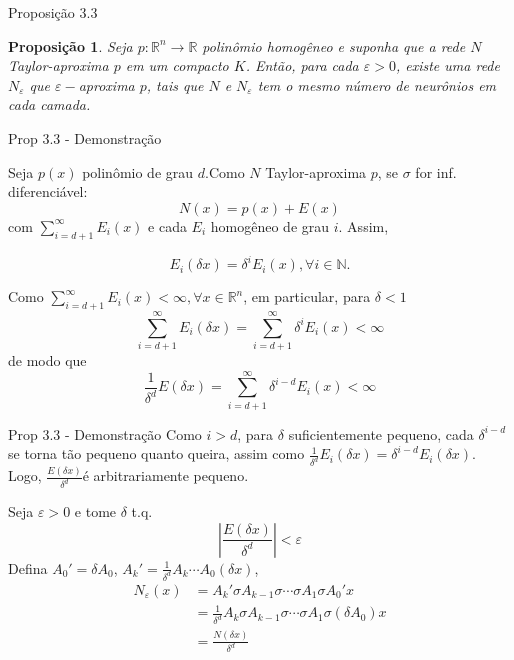 \documentclass{beamer}
\newtheorem{prop}{Proposição}[section]
\theoremstyle{definition}
\begin{document}
\begin{frame}{Proposição 3.3}
    \begin{prop}
    Seja $p:\mathbb R^n \to \mathbb R$ polinômio homogêneo e suponha que a rede $N$ Taylor-aproxima $p$ em um compacto $K$. Então, para cada $\varepsilon>0$, existe uma rede $N_{\varepsilon}$ que $\varepsilon-$aproxima $p$, tais que $N$ e $N_\varepsilon$ tem o mesmo número de neurônios em cada camada.
    \end{prop}
\end{frame}

\begin{frame}{Prop 3.3 - Demonstração}
    \small

    Seja $p(x)$ polinômio de grau $d$.\pause Como $N$ Taylor-aproxima $p$, se $\sigma$ for inf. diferenciável:
    \begin{equation}
        N(x) = p(x) + E(x)
    \end{equation}
    com $\sum_{i=d+1}^\infty E_i(x)$ e cada $E_i$ homogêneo de grau $i$. \pause Assim,
    
    \begin{equation*}
        E_i(\delta x) = \delta^i E_i(x), \forall i \in \mathbb N.
    \end{equation*}

    \pause 

    Como $\sum_{i=d+1}^\infty E_i(x)<\infty, \forall x \in \mathbb R^n$, em particular, para $\delta<1$
    \begin{equation*}
        \sum_{i=d+1}^\infty E_i(\delta x) = \sum_{i=d+1}^\infty \delta^i E_i(x) <\infty
    \end{equation*}
    \pause de modo que
    \begin{equation*}
        \frac{1}{\delta^d} E(\delta x) = \sum_{i=d+1}^\infty \delta^{i-d} E_i(x) <\infty
    \end{equation*}
\end{frame}

\begin{frame}{Prop 3.3 - Demonstração}
    Como $i>d$, para $\delta$ suficientemente pequeno, cada $\delta^{i-d}$ se torna tão pequeno quanto queira, assim como $\frac{1}{\delta^d}E_i(\delta x) = \delta^{i-d} E_i(\delta x)$. Logo, $\frac{E(\delta x)}{\delta^d}$é arbitrariamente pequeno.

    \pause

    Seja $\varepsilon>0$ e tome $\delta$ t.q.
    \begin{equation}
        |\frac{E(\delta x)}{\delta^d} |<\varepsilon
    \end{equation}
    Defina $A_0' = \delta A_0$, $A_k' = \frac{1}{\delta^d} A_k \cdots A_0 (\delta x)$, \pause 
    \begin{align}
        N_\varepsilon(x) &= A_k' \sigma A_{k-1} \sigma \cdots \sigma A_1 \sigma A_0' x \\
        & = \frac{1}{\delta^d} A_k \sigma A_{k-1} \sigma \cdots \sigma A_1 \sigma (\delta A_0) x \\
        & = \frac{N(\delta x)}{\delta^d}
    \end{align}
\end{frame}
\end{document}
